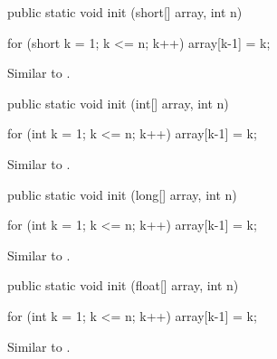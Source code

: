 \begin{code}

   public static void init (short[] array, int n)\begin{hide} {
      for (short k = 1; k <= n; k++)
         array[k-1] = k;
   }\end{hide}
\end{code}
\begin{tabb} Similar to .
\end{tabb}
\begin{htmlonly}
\end{htmlonly}
\begin{code}

   public static void init (int[] array, int n)\begin{hide} {
      for (int k = 1; k <= n; k++)
         array[k-1] = k;
   }\end{hide}
\end{code}
\begin{tabb} Similar to .
\end{tabb}
\begin{htmlonly}
\end{htmlonly}
\begin{code}

   public static void init (long[] array, int n)\begin{hide} {
      for (int k = 1; k <= n; k++)
         array[k-1] = k;
   }\end{hide}
\end{code}
\begin{tabb} Similar to .
\end{tabb}
\begin{htmlonly}
\end{htmlonly}
\begin{code}

   public static void init (float[] array, int n)\begin{hide} {
      for (int k = 1; k <= n; k++)
         array[k-1] = k;
   }\end{hide}
\end{code}
\begin{tabb} Similar to .
\end{tabb}
